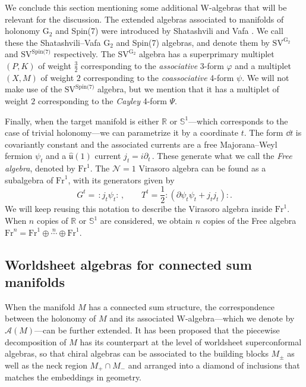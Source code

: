 \documentclass{pspum-l}
\newcommand{\SVseven}{\text{SV}^{\text{G}_2}}
\newcommand{\SVeight}{\text{SV}^\text{Spin(7)}}
\newcommand{\normord}[1]{:\mathrel{#1}:} %
\newcommand*\Sc{\mathbb{S}}
\newcommand*\R{\mathbb{R}}
\theoremstyle{definition}
\theoremstyle{remark}
\numberwithin{equation}{section}
\begin{document}
We conclude this section mentioning some additional W-algebras that will be relevant for the discussion. The extended algebras associated to manifolds of holonomy G$_2$ and Spin(7) were introduced by Shatashvili and Vafa \cite{Shatashvili:1994zw}. We call these the Shatashvili--Vafa G$_2$ and Spin(7) algebras, and denote them by $\SVseven$ and $\SVeight$ respectively. The $\SVseven$ algebra has a superprimary multiplet $(P,K)$ of weight $\frac{3}{2}$ corresponding to the \emph{associative} 3-form $\varphi$ and a multiplet $(X,M)$ of weight $2$ corresponding to the \emph{coassociative} 4-form $\psi$. We will not make use of the $\SVeight$ algebra, but we mention that it has a multiplet of weight $2$ corresponding to the \emph{Cayley} 4-form $\Psi$.

Finally, when the target manifold is either $\R$ or $\Sc^1$---which corresponds to the case of trivial holonomy---we can parametrize it by a coordinate $t$. The form $\dd t$ is covariantly constant and the associated currents are a free Majorana--Weyl fermion $\psi_t$ and a $\widehat{\mathfrak{u}}(1)$ current $j_t=i\partial_t \,$. These generate what we call the \emph{Free algebra}, denoted by $\text{Fr}^1$. The $\mathcal{N}=1$ Virasoro algebra can be found as a subalgebra of $\text{Fr}^1$, with its generators given by
\begin{equation} 
G^t = \, \normord{j_t\psi_t} \, , \qquad
T^t = \frac{1}{2}\normord{\left(\partial\psi_t\psi_t + j_t j_t\right)} .
\end{equation}
We will keep reusing this notation to describe the Virasoro algebra inside $\text{Fr}^1$. When $n$ copies of $\R$ or $\Sc^1$ are considered, we obtain $n$ copies of the Free algebra $\text{Fr}^n=\text{Fr}^1\oplus\overset{n}{\cdots}\oplus\text{Fr}^1$.




\subsection{Worldsheet algebras for connected sum manifolds}

\label{sec:introConnSumAlgebras}

When the manifold $M$ has a connected sum structure, the correspondence between the holonomy of $M$ and its associated W-algebra---which we denote by $\mathcal{A}(M)$---can be further extended. It has been proposed \cite{Fiset:2018huv, Fiset:2021ruv} that the piecewise decomposition of $M$ has its counterpart at the level of worldsheet superconformal algebras, so that chiral algebras can be associated to the building blocks $M_\pm$ as well as the neck region $M_+\cap M_-$ and arranged into a diamond of inclusions that matches the embeddings in geometry.
\end{document}
